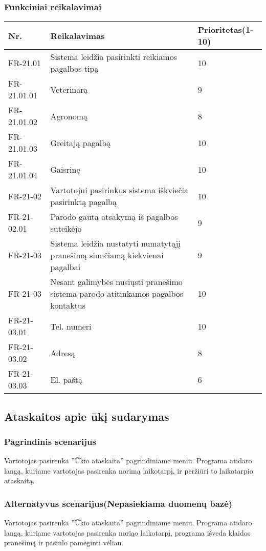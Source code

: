 \documentclass[oneside]{VUMIFPSkursinis}
\begin{document}
	\subsubsection{Funkciniai reikalavimai}
	\begin{table}[htbp]
		\begin{tabularx}{1\textwidth}{ |P{2.5cm}|X|P{3cm }| }  \hline
			Nr. & Reikalavimas & Prioritetas(1-10) \\ \hline
			FR-21.01 & Sistema leidžia pasirinkti reikiamos pagalbos tipą & 10 \\ \hline
			FR-21.01.01 & Veterinarą & 9 \\ \hline
			FR-21.01.02 & Agronomą & 8 \\ \hline
			FR-21.01.03 & Greitają pagalbą & 10 \\ \hline
			FR-21.01.04 & Gaisrinę & 10 \\ \hline
			FR-21-02 & Vartotojui pasirinkus sistema iškviečia pasirinktą pagalbą & 10 \\ \hline	
			FR-21-02.01 & Parodo gautą atsakymą iš pagalbos suteikėjo & 9 \\ \hline
			FR-21-03 & Sistema leidžia nustatyti numatytąjį pranešimą siunčiamą kiekvienai pagalbai & 9 \\ \hline	
			FR-21-03 & Nesant galimybės nusiųsti pranešimo sistema parodo atitinkamos pagalbos kontaktus & 10 \\ \hline	
			FR-21-03.01 & Tel. numeri & 10 \\ \hline	
			FR-21-03.02 & Adresą & 8 \\ \hline	
			FR-21-03.03 & El. paštą & 6 \\ \hline						
		\end{tabularx}
	\end{table}
\subsection{Ataskaitos apie ūkį sudarymas}
	\subsubsection{Pagrindinis scenarijus}
	Vartotojas pasirenka ''Ūkio ataskaita'' pagrindiniame meniu. Programa atidaro langą, kuriame vartotojas pasirenka norimą laikotarpį, ir peržiūri to laikotarpio ataskaitą.
	\subsubsection{Alternatyvus scenarijus(Nepasiekiama duomenų bazė)}
	Vartotojas pasirenka ''Ūkio ataskaita'' pagrindiniame meniu. Programa atidaro langą, kuriame vartotojas pasirenka noriąo laikotarpį, programa išveda klaidos pranešimą ir pasiūlo pamėginti vėliau.
\end{document}
